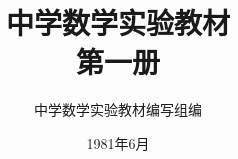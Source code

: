 \documentclass[b5paper, openany]{ctexbook}
\theoremstyle{plain}
\begin{document}
\title{\Huge\bfseries 中学数学实验教材\\第一册}



\author{\Large 中学数学实验教材编写组编}
\date{\Large 1981年6月}

\maketitle




\frontmatter


\tableofcontents


\mainmatter

 

 
 

 

 
\end{document}
